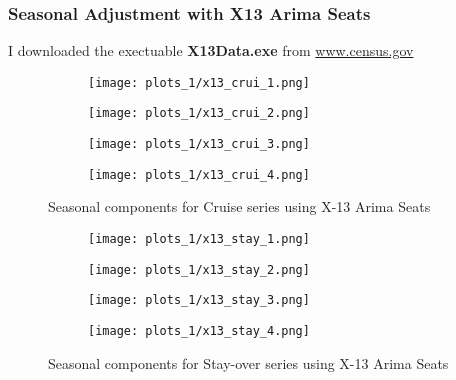 \documentclass[11pt]{article}
\begin{document}
\subsubsection{Seasonal Adjustment with X13 Arima Seats}
I downloaded the exectuable \textbf{X13Data.exe} from \href{https://www.census.gov/srd/www/x13as/}{www.census.gov}
%
\begin{figure}[h!]
    \centering
    \begin{subfigure}[t]{0.45\textwidth}
         \texttt{[image: plots\_1/x13\_crui\_1.png]}
    \end{subfigure}
    \begin{subfigure}[t]{0.45\textwidth}
          \texttt{[image: plots\_1/x13\_crui\_2.png]}
    \end{subfigure}
    \begin{subfigure}[t]{0.45\textwidth}
         \texttt{[image: plots\_1/x13\_crui\_3.png]}
    \end{subfigure}
    \begin{subfigure}[t]{0.45\textwidth}
          \texttt{[image: plots\_1/x13\_crui\_4.png]}
    \end{subfigure}
    \caption{Seasonal components for Cruise series using X-13 Arima Seats}
    \label{fig:x13arimacruise1}
\end{figure}

\begin{figure}[h!]
    \centering
    \begin{subfigure}[t]{0.45\textwidth}
         \texttt{[image: plots\_1/x13\_stay\_1.png]}
    \end{subfigure}
    \begin{subfigure}[t]{0.45\textwidth}
          \texttt{[image: plots\_1/x13\_stay\_2.png]}
    \end{subfigure}
    \begin{subfigure}[t]{0.45\textwidth}
         \texttt{[image: plots\_1/x13\_stay\_3.png]}
    \end{subfigure}
    \begin{subfigure}[t]{0.45\textwidth}
          \texttt{[image: plots\_1/x13\_stay\_4.png]}
    \end{subfigure}
    \caption{Seasonal components for Stay-over series using X-13 Arima Seats}
    \label{fig:x13arimastay1}
\end{figure}
\end{document}
